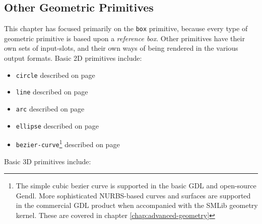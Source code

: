 \documentclass [11pt]{book}
\begin{document}
\subsection{Other Geometric Primitives}

\label{subsec:othergeometricprimitives}

This chapter has focused primarily on the \texttt{box} primitive, because every type of geometric primitive is based upon a \emph{reference box}. Other primitives have their own sets of input-slots, and their
     own ways of being rendered in the various output formats. Basic
     2D primitives include:

\begin{itemize}

\item \texttt{circle} described on page 
\pageref{prim:circle}

\item \texttt{line} described on page 
\pageref{prim:line}

\item \texttt{arc} described on page 
\pageref{prim:arc}

\item \texttt{ellipse} described on page 
\pageref{prim:ellipse}

\item \texttt{bezier-curve}\footnote{The simple cubic bezier curve is supported
	       in the basic GDL and open-source Gendl. More
	       sophisticated NURBS-based curves and surfaces are
	       supported in the commercial GDL product when
	       accompanied with the SMLib geometry kernel. These are
	       covered in chapter 
\ref{chap:advanced-geometry}} described on page 
\pageref{prim:bezier-curve}

\end{itemize}

Basic 3D primitives include:
\end{document}
